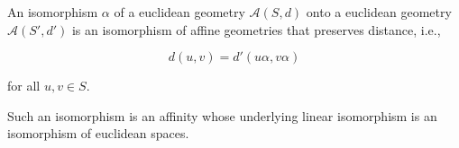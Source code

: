 An isomorphism $\alpha$ of a euclidean geometry $\mathcal{A}(S, d)$ onto a euclidean geometry $\mathcal{A}(S', d')$ is an isomorphism of affine geometries that preserves distance, i.e.,

$$d(u, v) = d'(u\alpha, v\alpha)$$

for all $u, v \in S$.

Such an isomorphism is an affinity whose underlying linear isomorphism is an isomorphism of euclidean spaces.
